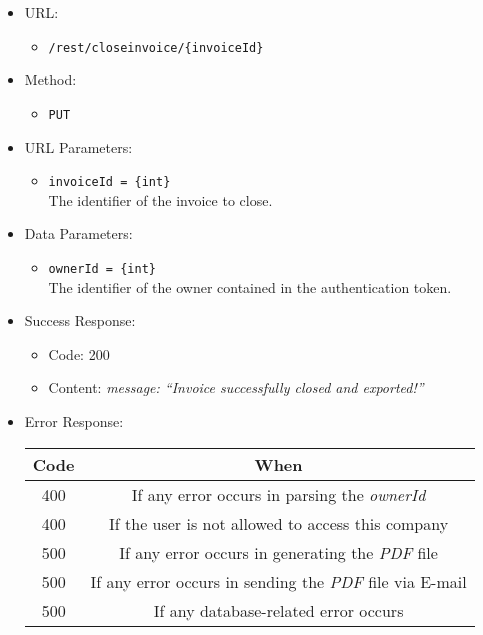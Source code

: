 \begin{itemize}
    
    \item URL: 
    \begin{itemize}
        \item \texttt{/rest/closeinvoice/\{invoiceId\}}
    \end{itemize}
    
    \item Method: 
    \begin{itemize}
        \item \texttt{PUT}
    \end{itemize}
    
    \item URL Parameters: 
    \begin{itemize}
        \item \texttt{invoiceId = \{int\}} \\
        The identifier of the invoice to close.
    \end{itemize}
    
    \item Data Parameters: 
    \begin{itemize}
        \item \texttt{ownerId = \{int\}} \\
        The identifier of the owner contained in the authentication token.
    \end{itemize}
    
    \item Success Response: 
    \begin{itemize}
        \item Code: 200
        \item Content:
        \textit{            
{
    message: “Invoice successfully closed and exported!”
}
        }
    \end{itemize}
    
    \item Error Response:
    \begin{table}[!h]
    \centering 
    \begin{tabular}{|c|c|}
    \hline
    \multicolumn{1}{|c|}{\textbf{Code}} & \multicolumn{1}{c|}{\textbf{When}} \\ \hline
    400 & If any error occurs in parsing the \textit{ownerId}  \\\hline
    400 & If the user is not allowed to access this company \\\hline
    500 & If any error occurs in generating the \textit{PDF} file \\\hline
    500 & If any error occurs in sending the \textit{PDF} file via E-mail\\\hline
    500 & If any database-related error occurs \\\hline
    \end{tabular} 
    \end{table} 
    
\end{itemize}


